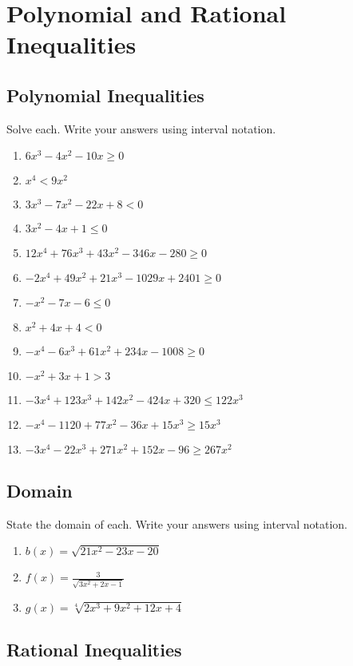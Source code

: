 \chapter{Polynomial and Rational Inequalities}

\section{Polynomial Inequalities}

Solve each. Write your answers using interval notation.
\begin{multicols}{2}
\begin{enumerate}
\item $6x^3-4x^2-10x \geq 0$
\item $x^4 < 9x^2$
\item $3x^3-7x^2-22x+8 < 0$
\item $3x^2 - 4x + 1 \leq 0$
\item $12x^4 + 76x^3 + 43x^2 - 346x - 280 \geq 0$
\item $-2x^4 + 49x^2 + 21x^3 - 1029x + 2401 \geq 0$
\item $-x^2 - 7x - 6 \leq 0$
\item $x^2 + 4x + 4 < 0$
\item $-x^4 - 6x^3 + 61x^2 + 234x - 1008 \geq 0$
\item $-x^2 + 3x + 1 > 3$
\item $-3x^4 + 123x^3 + 142x^2 - 424x + 320 \leq 122x^3$
\item $-x^4 - 1120 + 77x^2 - 36x + 15x^3 \geq 15x^3$
\item $-3x^4 - 22x^3 + 271x^2 + 152x - 96 \geq 267x^2$
\end{enumerate}
\end{multicols}

\section{Domain}

State the domain of each. Write your answers using interval notation.
\begin{enumerate}
\item $b(x) = \sqrt{21x^2 - 23x - 20}$
\item $f(x) = \frac{3}{\sqrt{3x^2 + 2x - 1}}$
\item $g(x) = \sqrt[4]{2x^3+9x^2+12x+4}$
\end{enumerate}

\section{Rational Inequalities}

